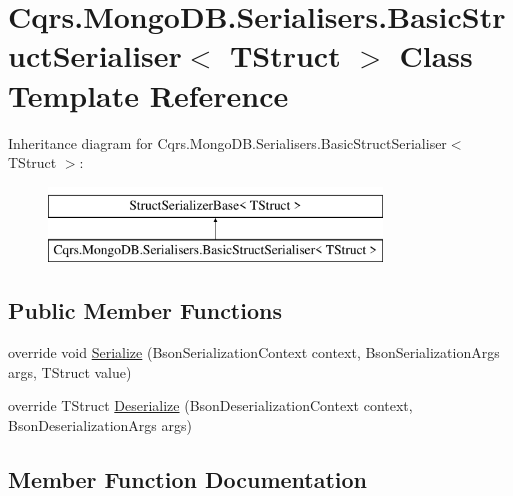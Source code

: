 \hypertarget{classCqrs_1_1MongoDB_1_1Serialisers_1_1BasicStructSerialiser}{}\section{Cqrs.\+Mongo\+D\+B.\+Serialisers.\+Basic\+Struct\+Serialiser$<$ T\+Struct $>$ Class Template Reference}
\label{classCqrs_1_1MongoDB_1_1Serialisers_1_1BasicStructSerialiser}
Inheritance diagram for Cqrs.\+Mongo\+D\+B.\+Serialisers.\+Basic\+Struct\+Serialiser$<$ T\+Struct $>$\+:\begin{figure}[H]
\begin{center}
\leavevmode
\includegraphics[height=2.000000cm]{classCqrs_1_1MongoDB_1_1Serialisers_1_1BasicStructSerialiser}
\end{center}
\end{figure}
\subsection*{Public Member Functions}
\begin{DoxyCompactItemize}
\item 
override void \hyperlink{classCqrs_1_1MongoDB_1_1Serialisers_1_1BasicStructSerialiser_afeddf8cf8fa5a761f01504795adafa9b_afeddf8cf8fa5a761f01504795adafa9b}{Serialize} (Bson\+Serialization\+Context context, Bson\+Serialization\+Args args, T\+Struct value)
\item 
override T\+Struct \hyperlink{classCqrs_1_1MongoDB_1_1Serialisers_1_1BasicStructSerialiser_ad27304148a7a67b6c86c277254108c95_ad27304148a7a67b6c86c277254108c95}{Deserialize} (Bson\+Deserialization\+Context context, Bson\+Deserialization\+Args args)
\end{DoxyCompactItemize}


\subsection{Member Function Documentation}
\mbox{\label{classCqrs_1_1MongoDB_1_1Serialisers_1_1BasicStructSerialiser_ad27304148a7a67b6c86c277254108c95_ad27304148a7a67b6c86c277254108c95}} 
